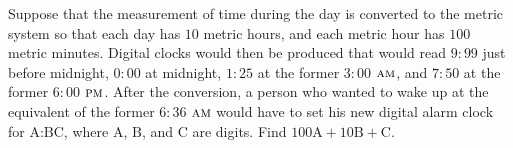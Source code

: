 Suppose that the measurement of time during the day is converted to the metric system so that each day has $10$ metric hours, and each metric hour has $100$ metric minutes.  Digital clocks would then be produced that would read $9{:}99$ just before midnight, $0{:}00$ at midnight, $1{:}25$ at the former $3{:}00$ $\textsc{am}$, and $7{:}50$ at the former $6{:}00$ $\textsc{pm}$.  After the conversion, a person who wanted to wake up at the equivalent of the former $6{:}36$ $\textsc{am}$ would have to set his new digital alarm clock for $\text{A:BC}$, where $\text{A}$, $\text{B}$, and $\text{C}$ are digits.  Find $100\text{A} + 10\text{B} + \text{C}$.